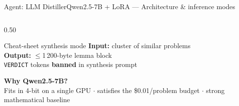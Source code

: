 \documentclass[aspectratio=169,10pt]{beamer}
\newcommand{\cy}[1]{\textcolor{AccentBlue}{\textbf{#1}}}
\begin{document}
\begin{frame}{Agent: LLM Distiller}{Qwen2.5-7B + LoRA — Architecture \& inference modes}
\begin{columns}[T,onlytextwidth]
\begin{column}{0.50\textwidth}
    \vspace{3mm}

    \begin{block}{Cheat-sheet synthesis mode}
      \textbf{Input:} cluster of similar problems\\
      \textbf{Output:} $\leq$1\,200-byte lemma block\\
      \texttt{VERDICT} tokens \textbf{banned} in synthesis prompt
    \end{block}

    \vspace{3mm}
    \cy{Why Qwen2.5-7B?}\\[3pt]
    \scriptsize
    Fits in 4-bit on a single GPU $\cdot$
    satisfies the \$0.01/problem budget $\cdot$
    strong mathematical baseline
  \end{column}
\end{columns}
\end{frame}
\end{document}
